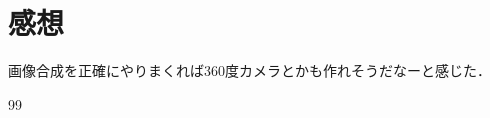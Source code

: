 \documentclass[autodetect-engine,dvi=dvipdfmx,ja=standard,
               a4j,11pt]{bxjsarticle}
\begin{document}




\section{感想}

画像合成を正確にやりまくれば360度カメラとかも作れそうだなーと感じた．

\begin{thebibliography}{99}
\end{thebibliography}

\end{document}
